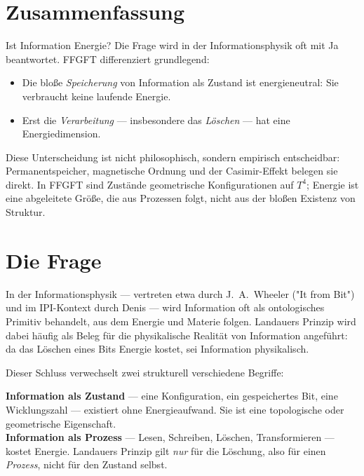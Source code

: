 
\section*{Zusammenfassung}

Ist Information Energie? Die Frage wird in der Informationsphysik oft mit Ja
beantwortet. FFGFT differenziert grundlegend:

\begin{itemize}
  \item Die bloße \emph{Speicherung} von Information als Zustand ist energieneutral:
        Sie verbraucht keine laufende Energie.
  \item Erst die \emph{Verarbeitung} — insbesondere das \emph{Löschen} — hat
        eine Energiedimension.
\end{itemize}

Diese Unterscheidung ist nicht philosophisch, sondern empirisch entscheidbar:
Permanentspeicher, magnetische Ordnung und der Casimir-Effekt belegen sie
direkt. In FFGFT sind Zustände geometrische Konfigurationen auf $T^4$; Energie
ist eine abgeleitete Größe, die aus Prozessen folgt, nicht aus der bloßen
Existenz von Struktur.

\section{Die Frage}

In der Informationsphysik — vertreten etwa durch J.~A.~Wheeler ("It from Bit")
\cite{Wheeler1990} und im IPI-Kontext durch Denis \cite{Denis2023} — wird
Information oft als ontologisches Primitiv behandelt, aus dem Energie und
Materie folgen. Landauers Prinzip \cite{Landauer1961} wird dabei häufig als
Beleg für die physikalische Realität von Information angeführt: da das Löschen
eines Bits Energie kostet, sei Information physikalisch.

Dieser Schluss verwechselt zwei strukturell verschiedene Begriffe:

\begin{keyresult}
\textbf{Information als Zustand} — eine Konfiguration, ein gespeichertes Bit,
eine Wicklungszahl — existiert ohne Energieaufwand. Sie ist eine topologische
oder geometrische Eigenschaft.\\
\textbf{Information als Prozess} — Lesen, Schreiben, Löschen, Transformieren
— kostet Energie. Landauers Prinzip gilt \emph{nur} für die Löschung, also
für einen \emph{Prozess}, nicht für den Zustand selbst.
\end{keyresult}

